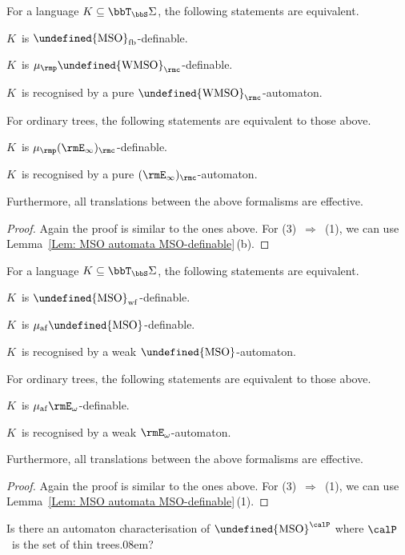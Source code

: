 \documentclass[10pt, fleqn]{scrartcl}
\makeatletter
\newcommand\m@thsm@ller[2]{\mbox{\relscale{0.91}$\m@th#1#2$}}
\let\smaller\undefined
\DeclareRobustCommand\smaller[1]{\relax\ifmmode{\mathpalette\m@thsm@ller{#1}}\else{\relscale{0.91}#1}\fi}
\newcommand*{\WMSO}{\smaller{\mathrm{WMSO}}}
\newcommand*{\MSO}{\smaller{\mathrm{MSO}}}
\newcommand*{\muaf}{\mu_{\mathrm{af}}}
\newcommand*{\mup}{\mu_\rmp}
\newcommand*{\?}{\kern .08em}
\makeatother
\begin{document}
\begin{Thm}
For a language $K \subseteq \bbT_\bbS\Sigma$, the following statements are equivalent.
\begin{enum1}
\item $K$~is $\MSO_{\mathrm{fb}}$-definable.
\item $K$~is $\mup\WMSO_\rmc$-definable.
\item $K$~is recognised by a pure $\WMSO_\rmc$-automaton.
\end{enum1}
For ordinary trees, the following statements are equivalent to those above.
\begin{enum1}[start=4]
\item $K$~is $\mup(\rmE_\infty)_\rmc$-definable.
\item $K$~is recognised by a pure $(\rmE_\infty)_\rmc$-automaton.
\end{enum1}
Furthermore, all translations between the above formalisms are effective.
\end{Thm}
\begin{proof}
Again the proof is similar to the ones above.
For (3)~$\Rightarrow$~(1), we can use Lemma~\ref{Lem: MSO automata MSO-definable}\,(b).
\end{proof}

\begin{Thm}
For a language $K \subseteq \bbT_\bbS\Sigma$, the following statements are equivalent.
\begin{enum1}
\item $K$~is $\MSO_{\mathrm{wf}}$-definable.
\item $K$~is $\muaf\MSO$-definable.
\item $K$~is recognised by a weak $\MSO$-automaton.
\end{enum1}
For ordinary trees, the following statements are equivalent to those above.
\begin{enum1}[start=4]
\item $K$~is $\muaf\rmE_\omega$-definable.
\item $K$~is recognised by a weak $\rmE_\omega$-automaton.
\end{enum1}
Furthermore, all translations between the above formalisms are effective.
\end{Thm}
\begin{proof}
Again the proof is similar to the ones above.
For (3)~$\Rightarrow$~(1), we can use Lemma~\ref{Lem: MSO automata MSO-definable}\,(1).
\end{proof}

\begin{Open}
Is there an automaton characterisation of $\MSO^\calP$ where $\calP$~is the set of thin trees\??
\end{Open}
\end{document}
